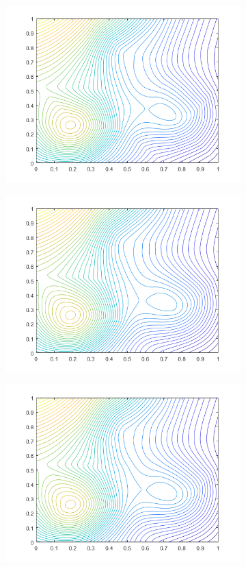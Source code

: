 \documentclass{article}
\begin{document}
\begin{figure}[H]
\centering
\begin{subfigure}{.3\textwidth}
\includegraphics[width=\linewidth]{slike/contour1.png}
\end{subfigure}
\begin{subfigure}{.3\textwidth}
\includegraphics[width=\linewidth]{slike/contour2.png}
\end{subfigure}
\begin{subfigure}{.3\textwidth}
\includegraphics[width=\linewidth]{slike/contour3.png}

\end{subfigure}
\end{figure}
\end{document}
